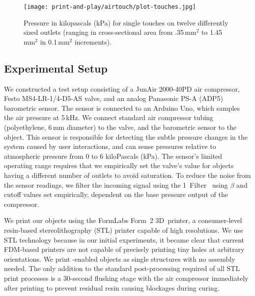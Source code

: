 			\begin{figure}
				\centering
					\texttt{[image: print-and-play/airtouch/plot-touches.jpg]}
					\caption{Pressure in kilopascals (kPa) for single touches on twelve
						differently sized outlets (ranging in cross-sectional area from
						.35\,mm$^2$ to 1.45\,mm$^2$ in 0.1\,mm$^2$ increments).}
					\label{fig:bar-touches}
			\end{figure}

			\subsection{Experimental Setup}
				We constructed a test setup consisting of a JunAir 2000-40PD air
				compressor, Festo MS4-LR-1/4-D5-AS valve, and an analog Panasonic PS-A
				(ADP5) barometric sensor. The sensor is connected to an Arduino Uno,
				which samples the air pressure at 5\,kHz. We connect standard air
				compressor tubing (polyethylene, 6\,mm diameter) to the valve, and the
				barometric sensor to the object. This sensor is responsible for
				detecting the subtle pressure changes in the system caused by user
				interactions, and can sense pressures relative to atmospheric pressure
				from 0 to 6 kiloPascals (kPa). The sensor's limited operating range
				requires that we empirically set the valve's value for objects having a
				different number of outlets to avoid saturation. To reduce the noise
				from the sensor readings, we filter the incoming signal using the
				1\texteuro~Filter~\cite{Casiez:2012} using $\beta$ and cutoff values
				set empirically, dependent on the base pressure output of the
				compressor.
					
				We print our objects using the FormLabs Form~2 3D~printer, a
				consumer-level resin-based stereolithography (STL) printer capable of
				high resolutions. We use STL technology because in our initial
				experiments, it became clear that current FDM-based printers are not
				capable of precisely printing tiny holes at arbitrary orientations. We
				print \at-enabled objects as single structures with no assembly needed.
				The only addition to the standard post-processing required of all STL
				print processes is a 30-second flushing stage with the air compressor
				immediately after printing to prevent residual resin causing blockages
				during curing.

